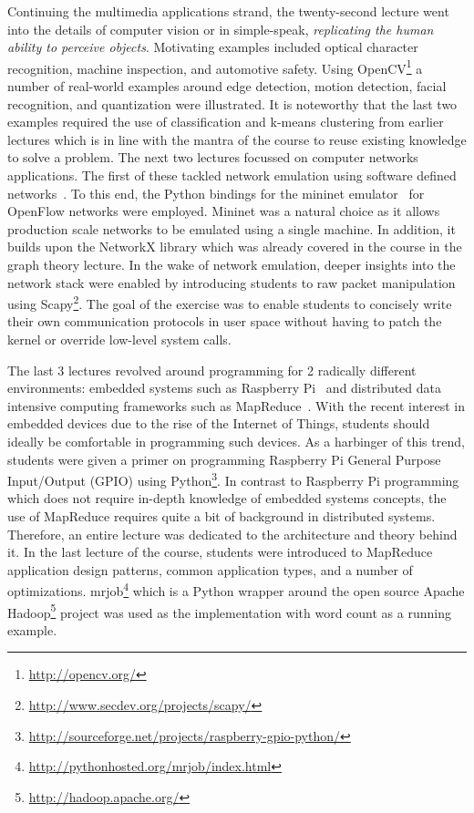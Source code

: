 \documentclass[letterpaper,twocolumn,10pt]{article}
\begin{document}
Continuing the multimedia applications strand, the twenty-second lecture went
into the details of computer vision or in simple-speak, \emph{replicating the
human ability to perceive objects}. Motivating examples included optical
character recognition, machine inspection, and automotive safety. Using
OpenCV\footnote{\url{http://opencv.org/}} a number of real-world examples around
edge detection, motion detection, facial recognition, and quantization were
illustrated. It is noteworthy that the last two examples required the use of
classification and k-means clustering from earlier lectures which is in line
with the mantra of the course to reuse existing knowledge to solve a problem.
The next two lectures focussed on computer networks applications. The first of
these tackled network emulation using software defined
networks~\cite{McKeown:2008:OEI}. To this end, the Python bindings for the
mininet emulator~\cite{Lantz:2010:NLR} for OpenFlow networks were employed.
Mininet was a natural choice as it allows production scale networks to be
emulated using a single machine. In addition, it builds upon the NetworkX
library which was already covered in the course in the graph theory lecture. In
the wake of network emulation, deeper insights into the network stack were
enabled by introducing students to raw packet manipulation using
Scapy\footnote{\url{http://www.secdev.org/projects/scapy/}}. The goal of the
exercise was to enable students to concisely write their own communication
protocols in user space without having to patch the kernel or override low-level
system calls.

The last 3 lectures revolved around programming for 2 radically different
environments: embedded systems such as Raspberry Pi~\cite{upton2012meet} and
distributed data intensive computing frameworks such as
MapReduce~\cite{Dean:2004:MSD}. With the recent interest in embedded devices due
to the rise of the Internet of Things, students should ideally be comfortable in
programming such devices. As a harbinger of this trend, students were given a
primer on programming Raspberry Pi General Purpose Input/Output (GPIO) using
Python\footnote{\url{http://sourceforge.net/projects/raspberry-gpio-python/}}.
In contrast to Raspberry Pi programming which does not require in-depth
knowledge of embedded systems concepts, the use of MapReduce requires quite a
bit of background in distributed systems. Therefore, an entire lecture was
dedicated to the architecture and theory behind it. In the last lecture of the
course, students were introduced to MapReduce application design patterns,
common application types, and a number of optimizations.
mrjob\footnote{\url{http://pythonhosted.org/mrjob/index.html}} which is a Python
wrapper around the open source Apache
Hadoop\footnote{\url{http://hadoop.apache.org/}} project was used as the
implementation with word count as a running example.
\end{document}

